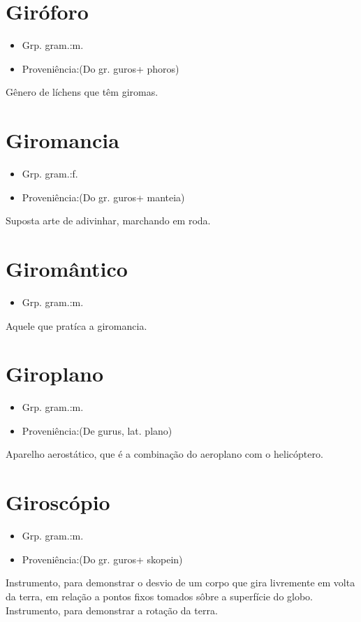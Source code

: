 \section{Giróforo}
\begin{itemize}
\item {Grp. gram.:m.}
\end{itemize}
\begin{itemize}
\item {Proveniência:(Do gr. \textunderscore guros\textunderscore  + \textunderscore phoros\textunderscore )}
\end{itemize}
Gênero de líchens que têm giromas.
\section{Giromancia}
\begin{itemize}
\item {Grp. gram.:f.}
\end{itemize}
\begin{itemize}
\item {Proveniência:(Do gr. \textunderscore guros\textunderscore  + \textunderscore manteia\textunderscore )}
\end{itemize}
Suposta arte de adivinhar, marchando em roda.
\section{Giromântico}
\begin{itemize}
\item {Grp. gram.:m.}
\end{itemize}
Aquele que pratíca a giromancia.
\section{Giroplano}
\begin{itemize}
\item {Grp. gram.:m.}
\end{itemize}
\begin{itemize}
\item {Proveniência:(De \textunderscore gurus\textunderscore , lat. \textunderscore plano\textunderscore )}
\end{itemize}
Aparelho aerostático, que é a combinação do aeroplano com o helicóptero.
\section{Giroscópio}
\begin{itemize}
\item {Grp. gram.:m.}
\end{itemize}
\begin{itemize}
\item {Proveniência:(Do gr. \textunderscore guros\textunderscore  + \textunderscore skopein\textunderscore )}
\end{itemize}
Instrumento, para demonstrar o desvio de um corpo que gira livremente em volta da terra, em relação a pontos fixos tomados sôbre a superfície do globo.
Instrumento, para demonstrar a rotação da terra.
